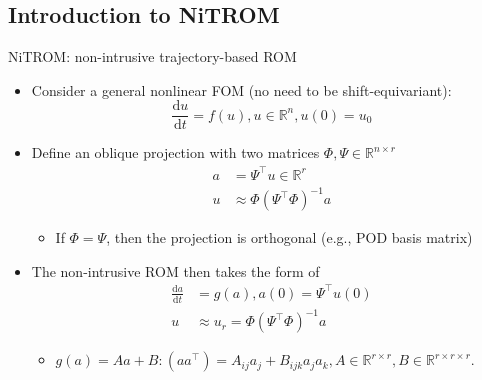 \documentclass[presentation]{beamer}
\begin{document}
\subsection{Introduction to NiTROM}
\label{sec:orgf4102ac}
\begin{frame}[label={sec:orge056cbf}]{NiTROM: non-intrusive trajectory-based ROM}
\begin{itemize}[<+->]
\item Consider a general nonlinear FOM (no need to be shift-equivariant):
\begin{equation}
   \label{eq:1}
   \frac{\mathrm{d}u}{\mathrm{d}t} = f(u), u\in\mathbb{R}^{n}, u(0) = u_{0}
\end{equation}
\item Define an oblique projection with two matrices \(\Phi, \Psi\in\mathbb{R}^{n\times r}\)
\begin{subequations}
\begin{align}
  \label{eq:2}
  a &= \Psi^{\top}u\in\mathbb{R}^{r}\\
  u &\approx \Phi(\Psi^{\top}\Phi)^{-1}a
\end{align}
\end{subequations}
\begin{itemize}
\item If \(\Phi = \Psi\), then the projection is orthogonal (e.g., POD basis matrix)
\end{itemize}
\item The non-intrusive ROM then takes the form of
\begin{subequations}
\begin{align}
  \label{eq:3}
  \frac{\mathrm{d}a}{\mathrm{d}t} &= g(a), a(0) = \Psi^{\top}u(0)\\
  u &\approx u_{r} = \Phi(\Psi^{\top}\Phi)^{-1}a
\end{align}
\end{subequations}
\begin{itemize}
\item \(g(a) = Aa + B:(aa^{\top}) = A_{ij}a_{j} + B_{ijk}a_{j}a_{k}, A\in\mathbb{R}^{r\times r}, B\in\mathbb{R}^{r\times r\times r}\).
\end{itemize}
\end{itemize}
\end{frame}
\end{document}
